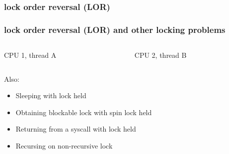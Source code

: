 \documentclass{beamer}
\begin{document}
\FootReferences{}{}
\begin{frame}
\frametitle<1>{lock order reversal (LOR)}
\frametitle<2>{lock order reversal (LOR) and other locking problems}
\begin{center}
\begin{columns}
  \begin{column}{.4\paperwidth}
    {\Large CPU 1, thread A}
  \end{column}
  \begin{column}{.4\paperwidth}
    {\Large CPU 2, thread B}
  \end{column}
\end{columns}
\end{center}
 {
  Also:
  \begin{itemize}
    \item {Sleeping with lock held}
    \item {Obtaining blockable lock with spin lock held}
    \item {Returning from a syscall with lock held}
    \item {Recursing on non-recursive lock}
  \end{itemize}
}
\end{frame}
\end{document}
